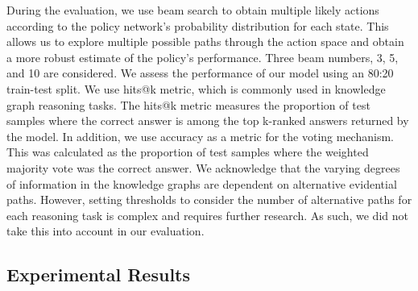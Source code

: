 During the evaluation, we use beam search to obtain multiple likely actions according to the policy network's probability distribution for each state. This allows us to explore multiple possible paths through the action space and obtain a more robust estimate of the policy's performance. Three beam numbers, 3, 5, and 10 %
are considered. We assess the performance of our model using an 80:20 train-test split. %
We use hits@k metric, which is commonly used in knowledge graph reasoning tasks. %
 The hits@k metric measures the proportion of test samples where the correct answer is among the top k-ranked answers returned by the model. In addition, we use accuracy as a metric for the voting mechanism. This was calculated as the proportion of test samples where the weighted majority vote was the correct answer. We acknowledge that the varying degrees of information in the knowledge graphs are dependent on alternative evidential paths. However, setting thresholds to consider the number of alternative paths for each reasoning task is complex and requires further research. As such, we did not take this into account in our evaluation.

\subsection{Experimental Results}\label{sec:resl}

